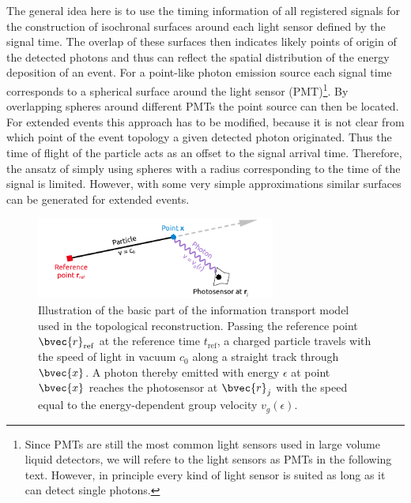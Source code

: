   The general idea here is to use the timing information of all registered signals for the construction of isochronal surfaces around each 
  light sensor defined by the signal time. The overlap of these surfaces then indicates likely points of origin of the detected photons 
  and thus can reflect the spatial distribution of the energy deposition of an event. For a point-like photon emission source each 
  signal time corresponds to a spherical surface around the light sensor (PMT)\footnote{Since PMTs are still the most common light sensors used in large 
  volume liquid detectors, we will refere to the light sensors as PMTs in the following text. However, in principle every kind of
  light sensor is suited as long as it can detect single photons.}. By overlapping spheres around different PMTs the point 
  source can then be located. For extended events this approach has to be modified, because it is not clear from which point of 
  the event topology a given detected photon originated. Thus the time of flight of the particle acts as an offset to the signal 
  arrival time. Therefore, the ansatz of simply using spheres with a radius corresponding to the time of the signal is limited. 
  However, with some very simple approximations similar surfaces can be generated for extended events.
  
\begin{figure}[b!t]
  \centering
    \includegraphics[width=0.70\textwidth]{recon/reco_signal_transport_concept.pdf}
    \caption{Illustration of the basic part of the information transport model used in the 
topological reconstruction. Passing the reference point $\bvec{r}_{\mathrm{ref}}$ at the
reference time $t_{\mathrm{ref}}$, a charged particle travels with the speed of light in vacuum
$c_0$ along a straight track through $\bvec{x}$. A photon thereby emitted with energy $\epsilon$ at 
point $\bvec{x}$ reaches the photosensor at $\bvec{r}_j$ with the speed equal to the 
energy-dependent group velocity $v_g(\epsilon)$.}
  \label{fig:InfoTransportModel}
\end{figure}
  
